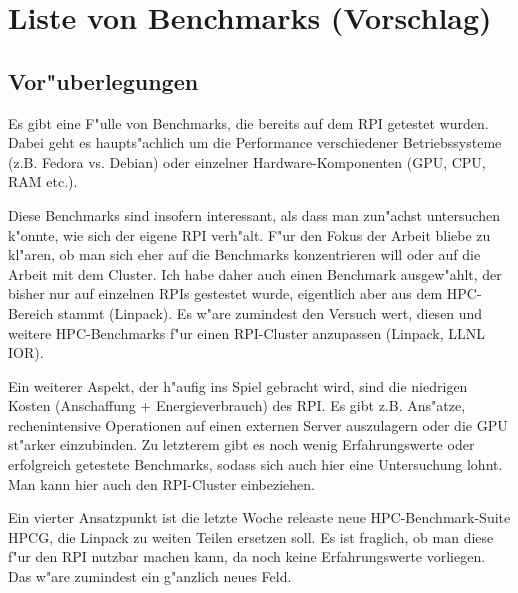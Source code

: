 \documentclass{scrartcl}
\begin{document}
\section{Liste von Benchmarks (Vorschlag)}
\subsection{Vor"uberlegungen}
Es gibt eine F"ulle von Benchmarks, die bereits auf dem RPI getestet wurden. Dabei geht es haupts"achlich um die Performance verschiedener Betriebssysteme (z.B. Fedora vs. Debian) oder einzelner Hardware-Komponenten (GPU, CPU, RAM etc.). 

Diese Benchmarks sind insofern interessant, als dass man zun"achst untersuchen k"onnte, wie sich der eigene RPI verh"alt. F"ur den Fokus der Arbeit bliebe zu kl"aren, ob man sich eher auf die Benchmarks konzentrieren will oder auf die Arbeit mit dem Cluster. Ich habe daher auch einen Benchmark ausgew"ahlt, der bisher nur auf einzelnen RPIs gestestet wurde, eigentlich aber aus dem HPC-Bereich stammt (Linpack). Es w"are zumindest den Versuch wert, diesen und weitere HPC-Benchmarks f"ur einen RPI-Cluster anzupassen (Linpack, LLNL IOR). 

Ein weiterer Aspekt, der h"aufig ins Spiel gebracht wird, sind die niedrigen Kosten (Anschaffung + Energieverbrauch) des RPI. Es gibt z.B. Ans"atze, rechenintensive Operationen auf einen externen Server auszulagern oder die GPU st"arker einzubinden. Zu letzterem gibt es noch wenig Erfahrungswerte oder erfolgreich getestete Benchmarks, sodass sich auch hier eine Untersuchung lohnt. Man kann hier auch den RPI-Cluster einbeziehen. 

Ein vierter Ansatzpunkt ist die letzte Woche releaste neue HPC-Benchmark-Suite HPCG, die Linpack zu weiten Teilen ersetzen soll. Es ist fraglich, ob man diese f"ur den RPI nutzbar machen kann, da noch keine Erfahrungswerte vorliegen. Das w"are zumindest ein g"anzlich neues Feld. 
\end{document}
